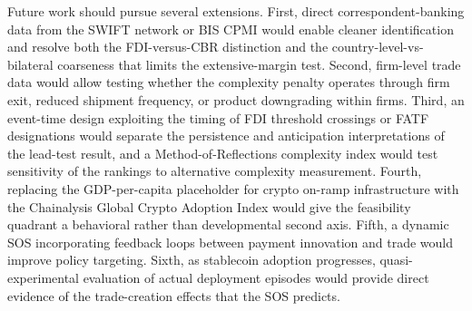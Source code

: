 Future work should pursue several extensions. First, direct correspondent-banking data from the SWIFT network or BIS CPMI would enable cleaner identification and resolve both the FDI-versus-CBR distinction and the country-level-vs-bilateral coarseness that limits the extensive-margin test. Second, firm-level trade data would allow testing whether the complexity penalty operates through firm exit, reduced shipment frequency, or product downgrading within firms. Third, an event-time design exploiting the timing of FDI threshold crossings or FATF designations would separate the persistence and anticipation interpretations of the lead-test result, and a Method-of-Reflections complexity index would test sensitivity of the rankings to alternative complexity measurement. Fourth, replacing the GDP-per-capita placeholder for crypto on-ramp infrastructure with the Chainalysis Global Crypto Adoption Index would give the feasibility quadrant a behavioral rather than developmental second axis. Fifth, a dynamic SOS incorporating feedback loops between payment innovation and trade would improve policy targeting. Sixth, as stablecoin adoption progresses, quasi-experimental evaluation of actual deployment episodes would provide direct evidence of the trade-creation effects that the SOS predicts.
